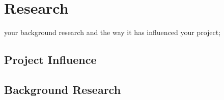 \section{Research}\label{research}

your background research and the way it has influenced your project;

\subsection{Project Influence}\label{project-influence}

\subsection{Background Research}\label{background-research}
